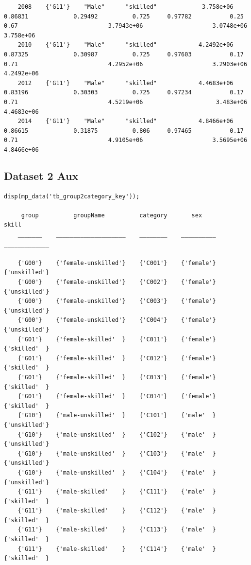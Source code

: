 \documentclass[
]{book}
\begin{document}
\begin{verbatim}
    2008    {'G11'}    "Male"      "skilled"             3.758e+06            0.86831             0.29492          0.725     0.97782           0.25               0.67                          3.7943e+06                    3.0748e+06              3.758e+06        
    2010    {'G11'}    "Male"      "skilled"            4.2492e+06            0.87325             0.30987          0.725     0.97603           0.17               0.71                          4.2952e+06                    3.2903e+06             4.2492e+06        
    2012    {'G11'}    "Male"      "skilled"            4.4683e+06            0.83196             0.30303          0.725     0.97234           0.17               0.71                          4.5219e+06                     3.483e+06             4.4683e+06        
    2014    {'G11'}    "Male"      "skilled"            4.8466e+06            0.86615             0.31875          0.806     0.97465           0.17               0.71                          4.9105e+06                    3.5695e+06             4.8466e+06        
\end{verbatim}

\hypertarget{dataset-2-aux}{%
\subsection{Dataset 2 Aux}\label{dataset-2-aux}}

\begin{verbatim}
disp(mp_data('tb_group2category_key'));

     group          groupName          category       sex            skill    
    _______    ____________________    ________    __________    _____________

    {'G00'}    {'female-unskilled'}    {'C001'}    {'female'}    {'unskilled'}
    {'G00'}    {'female-unskilled'}    {'C002'}    {'female'}    {'unskilled'}
    {'G00'}    {'female-unskilled'}    {'C003'}    {'female'}    {'unskilled'}
    {'G00'}    {'female-unskilled'}    {'C004'}    {'female'}    {'unskilled'}
    {'G01'}    {'female-skilled'  }    {'C011'}    {'female'}    {'skilled'  }
    {'G01'}    {'female-skilled'  }    {'C012'}    {'female'}    {'skilled'  }
    {'G01'}    {'female-skilled'  }    {'C013'}    {'female'}    {'skilled'  }
    {'G01'}    {'female-skilled'  }    {'C014'}    {'female'}    {'skilled'  }
    {'G10'}    {'male-unskilled'  }    {'C101'}    {'male'  }    {'unskilled'}
    {'G10'}    {'male-unskilled'  }    {'C102'}    {'male'  }    {'unskilled'}
    {'G10'}    {'male-unskilled'  }    {'C103'}    {'male'  }    {'unskilled'}
    {'G10'}    {'male-unskilled'  }    {'C104'}    {'male'  }    {'unskilled'}
    {'G11'}    {'male-skilled'    }    {'C111'}    {'male'  }    {'skilled'  }
    {'G11'}    {'male-skilled'    }    {'C112'}    {'male'  }    {'skilled'  }
    {'G11'}    {'male-skilled'    }    {'C113'}    {'male'  }    {'skilled'  }
    {'G11'}    {'male-skilled'    }    {'C114'}    {'male'  }    {'skilled'  }
\end{verbatim}
\end{document}
